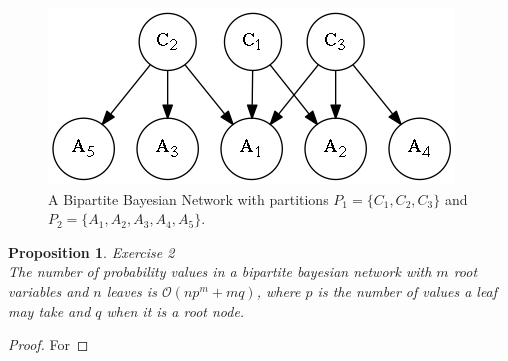 \documentclass{amsart}
\theoremstyle{plain}
\newtheorem{proposition}{Proposition}
\begin{document}
\begin{figure}[h]
  \captionsetup{justification=centering}
  \centering\includegraphics[scale=0.5]{graphs/bipartite.png}
  \caption{A Bipartite Bayesian Network with partitions $P_1=\{C_1,C_2,C_3\}$ and $P_2=\{A_1,A_2,
  A_3,A_4,A_5\}$.}
\end{figure}

\begin{proposition} Exercise 2\\
  The number of probability values in a bipartite bayesian network with $m$ root variables and $n$
  leaves is $\mathcal{O}(np^m+mq)$, where $p$ is the number of values a leaf may take and $q$ when
  it is a root node.
\end{proposition}

\begin{proof}
  For
\end{proof}

\newpage

\printbibliography[]
\end{document}
